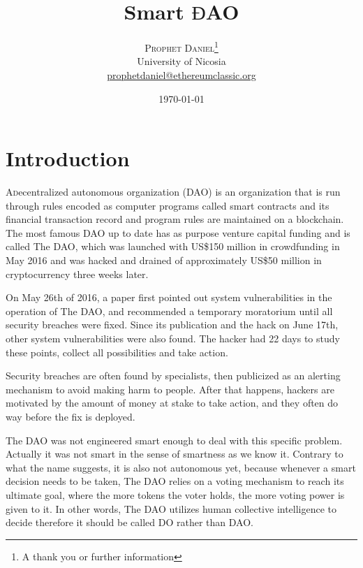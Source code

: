 \documentclass[twoside,twocolumn]{article}
\title{Smart $Ɖ$AO} %
\author{%
\textsc{Prophet Daniel}\thanks{A thank you or further information} \\[1ex] %
\normalsize University of Nicosia \\ %
\normalsize \href{mailto:prophetdaniel@ethereumclassic.org}{prophetdaniel@ethereumclassic.org} %
}
\date{\today} %
\begin{document}
\maketitle


\section{Introduction}

\lettrine[nindent=0em,lines=3]{A} decentralized autonomous organization (DAO) is an organization that is run through rules encoded as computer programs called smart contracts and its financial transaction record and program rules are maintained on a blockchain.
The most famous DAO up to date has as purpose venture capital funding and is called The DAO, which was launched with US\$150 million in crowdfunding in May 2016 and was hacked and drained of approximately US\$50 million in cryptocurrency three weeks later.\par 
On May 26th of 2016, a paper  first pointed out system vulnerabilities in the operation of The DAO, and recommended a temporary moratorium until all security breaches were fixed. Since its publication and the hack on June 17th, other system vulnerabilities were also found. The hacker had 22 days to study these points, collect all possibilities and take action.\par
Security breaches are often found by specialists, then publicized as an alerting mechanism to avoid making harm to people. After that happens, hackers are motivated by the amount of money at stake to take action, and they often do way before the fix is deployed.\par
The DAO was not engineered smart enough to deal with this specific problem. Actually it was not smart in the sense of smartness as we know it. Contrary to what the name suggests, it is also not autonomous yet, because whenever a smart decision needs to be taken, The DAO relies on a voting mechanism to reach its ultimate goal, where the more tokens the voter holds, the more voting power is given to it. In other words, The DAO utilizes human collective intelligence to decide therefore it should be called DO rather than DAO.

\end{document}

